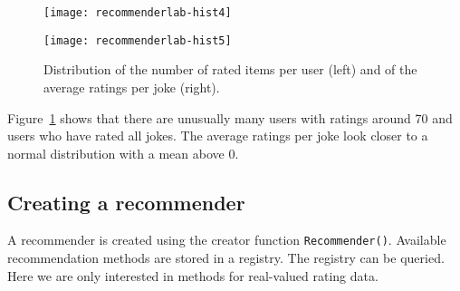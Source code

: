\documentclass[nojss]{jss}
\newcommand{\func}[1]{\mbox{\texttt{#1()}}}
\begin{document}
\begin{figure}
\begin{minipage}[b]{.48\linewidth}
\centerline{\texttt{[image: recommenderlab-hist4]}}
\end{minipage}
\begin{minipage}[b]{.48\linewidth}
\centerline{\texttt{[image: recommenderlab-hist5]}}
\end{minipage}
\caption{Distribution of the number of rated items per user (left) and
of the average ratings per joke (right).}
\label{fig:hist3}
\end{figure}


Figure~\ref{fig:hist3} shows that there are unusually many
users with ratings around 70 and users who have rated all jokes.
The average ratings per joke look closer to a normal distribution with
a mean above 0.


\subsection{Creating a recommender}

A recommender is created using the creator function \func{Recommender}.
Available recommendation methods are stored in a registry.
The registry can be queried. Here we are only interested in
methods for real-valued rating data.
\end{document}
